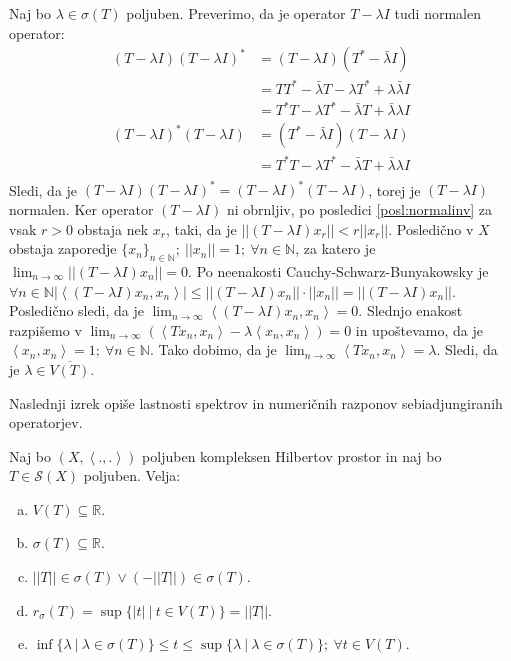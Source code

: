 \documentclass[mat2]{matdelo}
\newcommand{\R}{\mathbb{R}}
\newcommand{\N}{\mathbb{N}}
\newcommand{\abs}[1]{\ensuremath{\lvert #1 \rvert}}
\newcommand{\norm}[1]{\abs{\abs{#1}}}
\newcommand{\Sp}[2]{\ensuremath{\left<#1, #2\right>}}
\begin{document}
		\begin{dokaz}
			Naj bo $\lambda\in\sigma(T)$ poljuben. Preverimo, da je operator $T-\lambda I$ tudi normalen operator: \begin{align*}
				(T-\lambda I)(T - \lambda I)^* &= (T-\lambda I)(T^*-\bar{\lambda} I) \\
				&= TT^* - \bar{\lambda}T -\lambda T^* + \lambda\bar{\lambda} I \\
				&= T^*T -\lambda T^* -\bar{\lambda}T + \bar{\lambda}\lambda I \\
				(T-\lambda I)^*(T - \lambda I) &= (T^*-\bar{\lambda} I)(T-\lambda I) \\
				&= T^*T -\lambda T^* -\bar{\lambda}T + \bar{\lambda}\lambda I \\
			\end{align*}
			Sledi, da je $(T-\lambda I)(T - \lambda I)^* = (T-\lambda I)^*(T - \lambda I)$, torej je $(T-\lambda I)$ normalen. Ker operator $(T - \lambda I)$ ni obrnljiv, po posledici \ref{posl:normalinv} za vsak $r>0$ obstaja nek $x_r$, taki, da je $\norm{(T-\lambda I)x_r}< r\norm{x_r}$. Posledično v $X$ obstaja zaporedje $\{x_n\}_{n\in\N};~\norm{x_n} = 1;~\forall n\in\N$, za katero je $\lim_{n\to\infty}\norm{(T-\lambda I)x_n} = 0$.
			Po neenakosti Cauchy-Schwarz-Bunyakowsky je $\forall n\in\N \abs{\Sp{(T-\lambda I)x_n}{x_n}} \leq \norm{(T-\lambda I)x_n}\cdot\norm{x_n} = \norm{(T-\lambda I)x_n}$. Posledično sledi, da je $\lim_{n\to\infty}\Sp{(T-\lambda I)x_n}{x_n} = 0$. Slednjo enakost razpišemo v $\lim_{n\to\infty}(\Sp{Tx_n}{x_n}-\lambda\Sp{x_n}{x_n})=0$ in upoštevamo, da je $\Sp{x_n}{x_n} = 1;~\forall n\in\N$. Tako dobimo, da je $\lim_{n\to\infty}\Sp{Tx_n}{x_n} = \lambda$. Sledi, da je $\lambda \in \overline{V(T)}$.
		\end{dokaz}
		
		Naslednji izrek opiše lastnosti spektrov in numeričnih razponov sebiadjungiranih operatorjev.
		
		\begin{izrek}
			\label{izr:sebiadjnumraz}
			Naj bo $(X, \Sp{.}{.})$ poljuben kompleksen Hilbertov prostor in naj bo $T\in \mathcal{S}(X)$ poljuben. Velja: \begin{enumerate}[a)]
				\item $V(T)\subseteq \R$.
				\item $\sigma(T)\subseteq \R$.
				\item $\norm{T}\in\sigma(T)\lor (-\norm{T})\in\sigma(T)$.
				\item $r_\sigma(T)=\sup\{\abs{t}~|~t\in V(T)\} = \norm{T}$.
				\item $\inf\{\lambda~|~\lambda\in\sigma(T)\} \leq t \leq \sup\{\lambda~|~\lambda\in\sigma(T)\};~\forall t\in V(T)$.
			\end{enumerate}
		\end{izrek}
		
\end{document}

